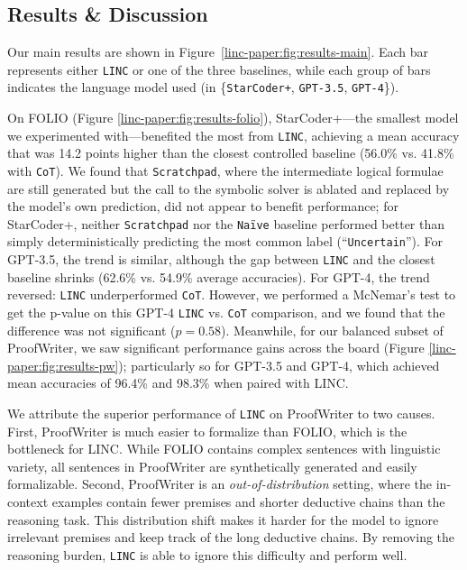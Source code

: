 \subsection{Results \& Discussion}
\label{linc-paper:sec:results_discussion}

Our main results are shown in Figure~\ref{linc-paper:fig:results-main}.
Each bar represents either \texttt{LINC} or one of the three baselines,
while each group of bars indicates the language model used (in \{\texttt{StarCoder+}, \texttt{GPT-3.5}, \texttt{GPT-4}\}).

On FOLIO (Figure \ref{linc-paper:fig:results-folio}), StarCoder+---the smallest model we experimented with---benefited the most from \texttt{LINC}, achieving a mean accuracy that was 14.2 points higher than the closest controlled baseline (56.0\% vs. 41.8\% with \texttt{CoT}).
We found that \texttt{Scratchpad}, where the intermediate logical formulae are still generated but the call to the symbolic solver is ablated and replaced by the model's own prediction, did not appear to benefit performance; for StarCoder+, neither \texttt{Scratchpad} nor the \texttt{Na\"ive} baseline performed better than simply deterministically predicting the most common label (``\texttt{Uncertain}'').
For GPT-3.5, the trend is similar, although the gap between \texttt{LINC} and the closest baseline shrinks (62.6\% vs. 54.9\% average accuracies).
For GPT-4, the trend reversed: \texttt{LINC} underperformed \texttt{CoT}. However, we performed a McNemar's test \cite{mcnemar1947note} to get the p-value on this GPT-4 \texttt{LINC} vs. \texttt{CoT} comparison, and we found that the difference was not significant ($p=0.58$).
Meanwhile, for our balanced subset of ProofWriter, we saw significant performance gains across the board (Figure \ref{linc-paper:fig:results-pw}); particularly so for GPT-3.5 and GPT-4, which achieved mean accuracies of 96.4\% and 98.3\% when paired with LINC.

We attribute the superior performance of \texttt{LINC} on ProofWriter to two causes.
First, ProofWriter is much easier to formalize than FOLIO, which is the bottleneck for LINC.
While FOLIO contains complex sentences with linguistic variety, all sentences in ProofWriter are synthetically generated and easily formalizable.
Second, ProofWriter is an \emph{out-of-distribution} setting, where the in-context examples contain fewer premises and shorter deductive chains than the
reasoning task.
This distribution shift makes it harder for the model to ignore irrelevant premises and keep track of the long deductive chains.
By removing the reasoning burden, \texttt{LINC} is able to ignore this difficulty and perform well.

